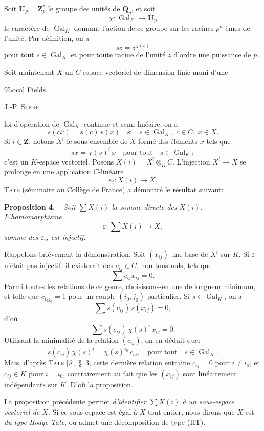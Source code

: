 Soit $\mathbf{U}_p=\mathbf{Z}_p^*$ le groupe des unités de $\mathbf{Q}_p$, et soit
\[
\chi:\operatorname{Gal}_K\to\mathbf{U}_p
\]
le caractère de $\operatorname{Gal}_K$ donnant l’action de ce groupe sur les racines $p^n$-èmes de l’unité. Par définition, on a
\[
sz=z^{\chi(s)}
\]
pour tout $s\in\operatorname{Gal}_K$ et pour toute racine de l’unité $z$ d’ordre une puissance de $p$.

Soit maintenant $X$ un $C$-espace vectoriel de dimension finie muni d’une

{\footnotesize 9\qquad Local Fields\par}
\begin{center}\small J.-P. \textsc{Serre}\end{center}
loi d’opération de $\operatorname{Gal}_K$ continue et semi-linéaire; on a
\[
s(cx)=s(c)\,s(x)\quad\text{si}\quad s\in\operatorname{Gal}_K,\ c\in C,\ x\in X.
\]
Si $i\in\mathbf{Z}$, notons $X^i$ le sous-ensemble de $X$ formé des éléments $x$ tels que
\[
sx=\chi(s)^i\,x\quad\text{pour tout}\quad s\in\operatorname{Gal}_K;
\]
c’est un $K$-espace vectoriel. Posons $X(i)=X^i\otimes_K C$. L’injection $X^i\to X$ se prolonge en une application $C$-linéaire
\[
\varepsilon_i:X(i)\to X.
\]
\textsc{Tate} (séminaire au Collège de France) a démontré le résultat suivant:

\textbf{Proposition 4.} -- \textit{Soit $\sum X(i)$ la somme directe des $X(i)$. L’homomorphisme}
\[
\varepsilon:\sum X(i)\to X,
\]
\textit{somme des $\varepsilon_i$, est injectif.}

Rappelons brièvement la démonstration. Soit $(x_{ij})$ une base de $X^i$ sur $K$. Si $\varepsilon$ n’était pas injectif, il existerait des $c_{ij}\in C$, non tous nuls, tels que
\[
\sum c_{ij}x_{ij}=0.
\]
Parmi toutes les relations de ce genre, choisissons-en une de longueur minimum, et telle que $c_{i_0j_0}=1$ pour un couple $(i_0,j_0)$ particulier. Si $s\in\operatorname{Gal}_K$, on a
\[
\sum s(c_{ij})\,s(x_{ij})=0,
\]
d’où
\[
\sum s(c_{ij})\,\chi(s)^i\,x_{ij}=0.
\]
Utilisant la minimalité de la relation $(c_{ij})$, on en déduit que:
\[
s(c_{ij})\,\chi(s)^i=\chi(s)^{i_0}\,c_{ij},\quad\text{pour tout}\quad s\in\operatorname{Gal}_K.
\]
Mais, d’après \textsc{Tate} [\textit{9}], \S~3, cette dernière relation entraîne $c_{ij}=0$ pour $i\ne i_0$, et $c_{ij}\in K$ pour $i=i_0$, contrairement au fait que les $(x_{ij})$ sont linéairement indépendants sur $K$. D’où la proposition.

La proposition précédente permet \textit{d’identifier $\sum X(i)$ à un sous-espace vectoriel de $X$.} Si ce sous-espace est égal à $X$ tout entier, nous dirons que $X$ est \textit{du type Hodge-Tate}, ou admet une décomposition de type (HT).

